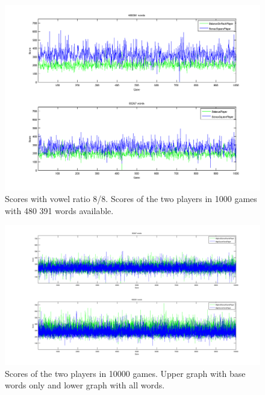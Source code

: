 \documentclass[a4paper, 12pt]{report}
\begin{document}
\begin{figure}[h]
\centering
\includegraphics[scale=0.5]{BonusBalance8vow_bothDict}
\caption {Scores with vowel ratio 8/8. Scores of the two players in 1000 games with 480 391 words available.}
\label{fig:bonusBalanceLargeDict}
\end{figure}

\begin{figure}
\centering
\includegraphics[scale=0.3]{Highest_Bonus_Round_vs_High_Score_Word_10000}
\caption {Scores of the two players in 10000 games. Upper graph with base words only and lower graph with all words.}
\label{fig:bs+hsw}
\end{figure}
\end{document}
